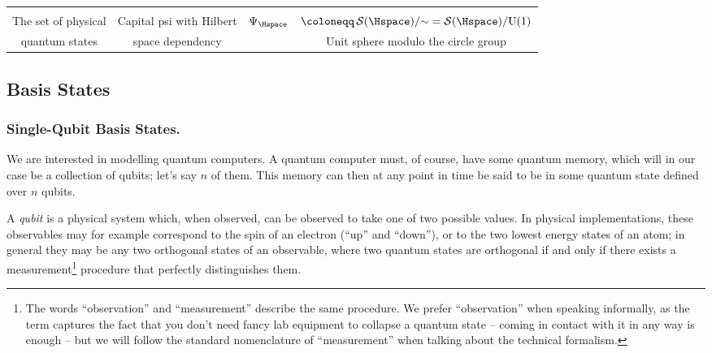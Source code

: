 \begin{table}
{\begin{tabular}{cccc}
        &&& \\
        The set of physical & Capital psi with Hilbert & $\Psi_\Hspace$ & $\coloneqq\, \mathcal{S}(\Hspace)/{\sim}
          = \mathcal{S}(\Hspace)/\mathrm{U}(1)$ \\
        quantum states & space dependency && Unit sphere modulo the circle group \\
        \bottomrule
      \end{tabular}}
    \end{table}


  \subsection{Basis States}
    \subsubsection{Single-Qubit Basis States.}
      We are interested in modelling quantum computers. A quantum computer must, of
        course, have some quantum memory, which will in our case be a collection of
        qubits; let's say $n$ of them. 
        This memory can then at any point in time be said to be in some quantum state
        defined over $n$ qubits. 

      A \emph{qubit} is a physical system which, when observed, can be observed
        to take one of two possible values. 
        In physical implementations, these observables may for
        example correspond to the spin of an electron (``up'' and ``down''),
        or to the two lowest energy states of an atom; in general they may be
        any two orthogonal states of an observable, where two quantum states are
        orthogonal if and only if there exists a measurement\footnote{
          The words ``observation'' and ``measurement'' describe the same
          procedure. We prefer ``observation'' when speaking informally,
          as the term captures the fact that you don't need fancy lab equipment to
          collapse a quantum state -- coming in contact with it in any way 
          is enough -- but we will follow the standard nomenclature of ``measurement''
          when talking about the technical formalism.
        } procedure that perfectly distinguishes them.

